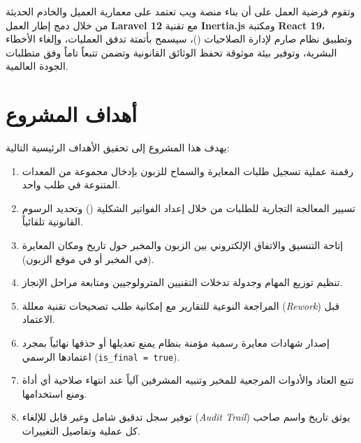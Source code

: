 \documentclass{bts-report-ar}
\begin{document}
وتقوم فرضية العمل على أن بناء منصة ويب تعتمد على معمارية العميل والخادم الحديثة من خلال دمج إطار العمل \textbf{Laravel 12} مع تقنية \textbf{Inertia.js} ومكتبة \textbf{React 19}، وتطبيق نظام صارم لإدارة الصلاحيات ()، سيسمح بأتمتة تدفق العمليات، وإلغاء الأخطاء البشرية، وتوفير بيئة موثوقة تحفظ الوثائق القانونية وتضمن تتبعاً تاماً وفق متطلبات الجودة العالمية.

\section*{أهداف المشروع}
يهدف هذا المشروع إلى تحقيق الأهداف الرئيسية التالية:
\begin{enumerate}
  \item رقمنة عملية تسجيل طلبات المعايرة والسماح للزبون بإدخال مجموعة من المعدات المتنوعة في طلب واحد.
  \item تسيير المعالجة التجارية للطلبات من خلال إعداد الفواتير الشكلية () وتحديد الرسوم القانونية تلقائياً.
  \item إتاحة التنسيق والاتفاق الإلكتروني بين الزبون والمخبر حول تاريخ ومكان المعايرة (في المخبر أو في موقع الزبون).
  \item تنظيم توزيع المهام وجدولة تدخلات التقنيين المترولوجيين ومتابعة مراحل الإنجاز.
  \item المراجعة النوعية للتقارير مع إمكانية طلب تصحيحات تقنية معللة (\textit{Rework}) قبل الاعتماد.
  \item إصدار شهادات معايرة رسمية مؤمنة بنظام يمنع تعديلها أو حذفها نهائياً بمجرد اعتمادها الرسمي (\texttt{is\_final = true}).
  \item تتبع العتاد والأدوات المرجعية للمخبر وتنبيه المشرفين آلياً عند انتهاء صلاحية أي أداة ومنع استخدامها.
  \item توفير سجل تدقيق شامل وغير قابل للإلغاء (\textit{Audit Trail}) يوثق تاريخ واسم صاحب كل عملية وتفاصيل التغييرات.
\end{enumerate}
\end{document}
